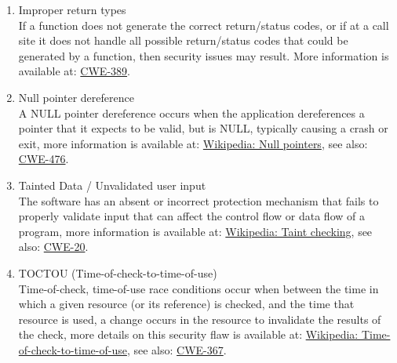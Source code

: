 \begin{enumerate}
         \item Improper return types \\
               If a function does not generate the correct return/status
               codes, or if at a call site it does not handle all possible return/status codes that could
               be generated by a function, then security issues may result. 
               More information is available at:
               \href{http://cwe.mitre.org/data/definitions/389.html}{CWE-389}.

         \item Null pointer dereference \\
               A NULL pointer dereference occurs when the application dereferences a
               pointer that it expects to be valid, but is NULL, typically causing a crash
               or exit, more information is available at:
               \href{http://en.wikipedia.org/wiki/Pointer}{Wikipedia: Null pointers}, 
               see also:
               \href{http://cwe.mitre.org/data/definitions/476.html}{CWE-476}.

         \item Tainted Data / Unvalidated user input \\
               The software has an absent or incorrect protection mechanism that fails to
               properly validate input that can affect the control flow or data flow of a
               program,
               more information is available at:
               \href{http://en.wikipedia.org/wiki/Taint_checking}{Wikipedia: Taint checking}, 
               see also:
               \href{http://cwe.mitre.org/data/definitions/20.html}{CWE-20}.

         \item TOCTOU (Time-of-check-to-time-of-use) \\
               Time-of-check, time-of-use race conditions occur when between the time in
               which a given resource (or its reference) is checked, and the time that
               resource is used, a change occurs in the resource to invalidate the results
               of the check, more details on this security flaw is available at:
               \href{http://en.wikipedia.org/wiki/Time-of-check-to-time-of-use}{Wikipedia: Time-of-check-to-time-of-use},
               see also:
               \href{http://cwe.mitre.org/data/definitions/367.html}{CWE-367}.


\end{enumerate}
